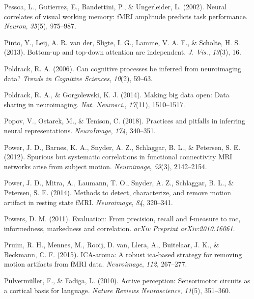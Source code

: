 \documentclass[11pt,american,]{memoir} %
\begin{document}
\leavevmode\hypertarget{ref-Pessoa2002-tb}{}%
Pessoa, L., Gutierrez, E., Bandettini, P., \& Ungerleider, L. (2002). Neural correlates of visual working memory: fMRI amplitude predicts task performance. \emph{Neuron}, \emph{35}(5), 975--987.

\leavevmode\hypertarget{ref-Pinto2013-kh}{}%
Pinto, Y., Leij, A. R. van der, Sligte, I. G., Lamme, V. A. F., \& Scholte, H. S. (2013). Bottom-up and top-down attention are independent. \emph{J. Vis.}, \emph{13}(3), 16.

\leavevmode\hypertarget{ref-poldrack2006can}{}%
Poldrack, R. A. (2006). Can cognitive processes be inferred from neuroimaging data? \emph{Trends in Cognitive Sciences}, \emph{10}(2), 59--63.

\leavevmode\hypertarget{ref-Poldrack2014-ov}{}%
Poldrack, R. A., \& Gorgolewski, K. J. (2014). Making big data open: Data sharing in neuroimaging. \emph{Nat. Neurosci.}, \emph{17}(11), 1510--1517.

\leavevmode\hypertarget{ref-popov2018practices}{}%
Popov, V., Ostarek, M., \& Tenison, C. (2018). Practices and pitfalls in inferring neural representations. \emph{NeuroImage}, \emph{174}, 340--351.

\leavevmode\hypertarget{ref-Power2012-kt}{}%
Power, J. D., Barnes, K. A., Snyder, A. Z., Schlaggar, B. L., \& Petersen, S. E. (2012). Spurious but systematic correlations in functional connectivity MRI networks arise from subject motion. \emph{Neuroimage}, \emph{59}(3), 2142--2154.

\leavevmode\hypertarget{ref-Power2014-gh}{}%
Power, J. D., Mitra, A., Laumann, T. O., Snyder, A. Z., Schlaggar, B. L., \& Petersen, S. E. (2014). Methods to detect, characterize, and remove motion artifact in resting state fMRI. \emph{Neuroimage}, \emph{84}, 320--341.

\leavevmode\hypertarget{ref-powers2020evaluation}{}%
Powers, D. M. (2011). Evaluation: From precision, recall and f-measure to roc, informedness, markedness and correlation. \emph{arXiv Preprint arXiv:2010.16061}.

\leavevmode\hypertarget{ref-pruim2015ica}{}%
Pruim, R. H., Mennes, M., Rooij, D. van, Llera, A., Buitelaar, J. K., \& Beckmann, C. F. (2015). ICA-aroma: A robust ica-based strategy for removing motion artifacts from fMRI data. \emph{Neuroimage}, \emph{112}, 267--277.

\leavevmode\hypertarget{ref-pulvermuller2010active}{}%
Pulvermüller, F., \& Fadiga, L. (2010). Active perception: Sensorimotor circuits as a cortical basis for language. \emph{Nature Reviews Neuroscience}, \emph{11}(5), 351--360.
\end{document}
